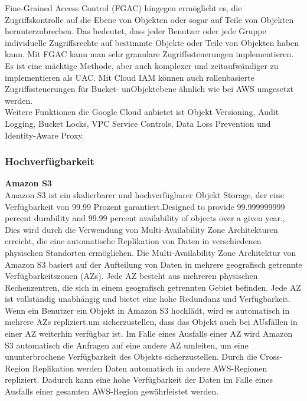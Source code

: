 Fine-Grained Access Control (FGAC) hingegen ermöglicht es, die Zugriffskontrolle auf die Ebene von Objekten oder sogar auf Teile von Objekten herunterzubrechen. Das bedeutet, dass jeder Benutzer oder jede Gruppe individuelle Zugriffsrechte auf bestimmte Objekte oder Teile von Objekten haben kann. Mit FGAC kann man sehr granulare Zugriffssteuerungen implementieren. Es ist eine mächtige Methode, aber auch komplexer und zeitaufwändiger zu implementieren als UAC. Mit Cloud IAM können auch rollenbasierte Zugriffssteuerungen für Bucket- unObjektebene ähnlich wie bei AWS umgesetzt werden.\\

Weitere Funktionen die Google Cloud anbietet ist Objekt Versioning, Audit Logging, Bucket Locks, VPC Service Controls, Data Loss Prevention und Identity-Aware Proxy.

\newpage

\subsubsection{Hochverfügbarkeit}

\textbf{Amazon S3}\\

Amazon S3 ist ein skalierbarer und hochverfügbarer Objekt Storage, der eine Verfügbarkeit von 99.99 Prozent garantiert.\glqq Designed to provide 99.999999999 percent durability and 99.99 percent availability of objects over a given year.\grqq, \cite{aws-availability}\\

Dies wird durch die Verwendung von Multi-Availability Zone Architekturen erreicht, die eine automatische Replikation von Daten in verschiedenen physischen Standorten ermöglichen. Die Multi-Availability Zone Architektur von Amazon S3 basiert auf der Aufteilung von Daten in mehrere geografisch getrennte Verfügbarkeitszonen (AZs). Jede AZ besteht aus mehreren physischen Rechenzentren, die sich in einem geografisch getrennten Gebiet befinden. Jede AZ ist vollständig unabhängig und bietet eine hohe Redundanz und Verfügbarkeit. Wenn ein Benutzer ein Objekt in Amazon S3 hochlädt, wird es automatisch in mehrere AZs repliziert.um sicherzustellen, dass das Objekt auch bei AUsfällen in einer AZ weiterhin verfügbar ist. Im Falle eines Ausfalls einer AZ wird Amazon S3 automatisch die Anfragen auf eine andere AZ umleiten, um eine ununterbrochene Verfügbarkeit des Objekts sicherzustellen. Durch die Cross-Region Replikation werden Daten automatisch in andere AWS-Regionen repliziert. Dadurch kann eine hohe Verfügbarkeit der Daten im Falle eines Ausfalls einer gesamten AWS-Region gewährleistet werden.\\

